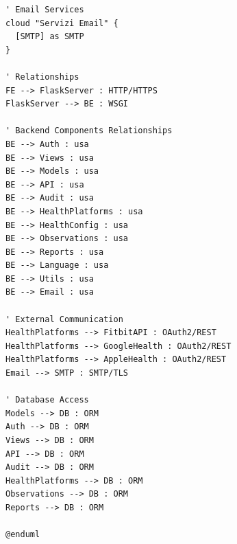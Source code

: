 \documentclass[12pt,a4paper,oneside]{report}
\begin{document}
\begin{lstlisting}[basicstyle=\small\ttfamily, breaklines=true]
' Email Services
cloud "Servizi Email" {
  [SMTP] as SMTP
}

' Relationships
FE --> FlaskServer : HTTP/HTTPS
FlaskServer --> BE : WSGI

' Backend Components Relationships
BE --> Auth : usa
BE --> Views : usa
BE --> Models : usa
BE --> API : usa
BE --> Audit : usa
BE --> HealthPlatforms : usa
BE --> HealthConfig : usa
BE --> Observations : usa
BE --> Reports : usa
BE --> Language : usa
BE --> Utils : usa
BE --> Email : usa

' External Communication
HealthPlatforms --> FitbitAPI : OAuth2/REST
HealthPlatforms --> GoogleHealth : OAuth2/REST
HealthPlatforms --> AppleHealth : OAuth2/REST
Email --> SMTP : SMTP/TLS

' Database Access
Models --> DB : ORM
Auth --> DB : ORM
Views --> DB : ORM
API --> DB : ORM
Audit --> DB : ORM
HealthPlatforms --> DB : ORM
Observations --> DB : ORM
Reports --> DB : ORM

@enduml

\end{lstlisting}
\end{document}
